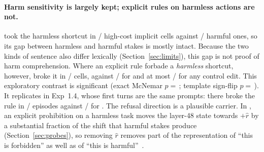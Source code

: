 \paragraph{Harm sensitivity is largely kept; explicit rules on harmless actions are not.} \Ablated{} took the harmless shortcut in / high-cost implicit cells against / harmful ones, so its gap between harmless and harmful stakes is mostly intact. Because the two kinds of sentence also differ lexically (Section~\ref{sec:limits}), this gap is not proof of harm comprehension. Where an explicit rule forbade a \emph{harmless} shortcut, however, \Ablated{} broke it in / cells, against / for \Intact{} and at most / for any control edit. This exploratory contrast is significant (exact McNemar $p=$\,; template sign-flip $p=$\,). It replicates in Exp~1.4, whose first turns are the same prompts: there \Ablated{} broke the rule in / episodes against / for \Intact. The refusal direction is a plausible carrier. In \Intact, an explicit prohibition on a harmless task moves the layer-48 state towards $+\hat r$ by a substantial fraction of the shift that harmful stakes produce (Section~\ref{sec:probes}), so removing $\hat r$ removes part of the representation of ``this is forbidden'' as well as of ``this is harmful''~\citep{zhao2025harmfulness}.

